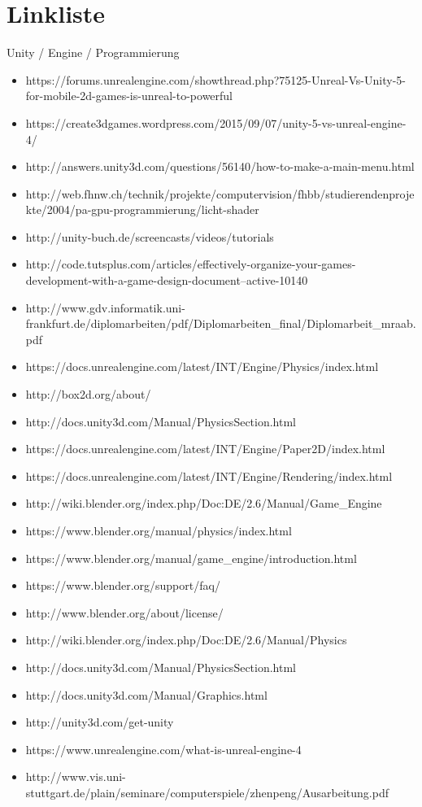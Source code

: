\section{Linkliste}

Unity / Engine / Programmierung
\begin{itemize}
\item https://forums.unrealengine.com/showthread.php?75125-Unreal-Vs-Unity-5-for-mobile-2d-games-is-unreal-to-powerful
\item https://create3dgames.wordpress.com/2015/09/07/unity-5-vs-unreal-engine-4/
\item http://answers.unity3d.com/questions/56140/how-to-make-a-main-menu.html
\item http://web.fhnw.ch/technik/projekte/computervision/fhbb/studierendenprojekte/2004/pa-gpu-programmierung/licht-shader
\item http://unity-buch.de/screencasts/videos/tutorials
\item http://code.tutsplus.com/articles/effectively-organize-your-games-development-with-a-game-design-document--active-10140
\item http://www.gdv.informatik.uni-frankfurt.de/diplomarbeiten/pdf/Diplomarbeiten\_final/Diplomarbeit\_mraab.pdf
\item https://docs.unrealengine.com/latest/INT/Engine/Physics/index.html
\item http://box2d.org/about/
\item http://docs.unity3d.com/Manual/PhysicsSection.html
\item https://docs.unrealengine.com/latest/INT/Engine/Paper2D/index.html
\item https://docs.unrealengine.com/latest/INT/Engine/Rendering/index.html
\item http://wiki.blender.org/index.php/Doc:DE/2.6/Manual/Game\_Engine
\item https://www.blender.org/manual/physics/index.html
\item https://www.blender.org/manual/game\_engine/introduction.html
\item https://www.blender.org/support/faq/
\item http://www.blender.org/about/license/
\item http://wiki.blender.org/index.php/Doc:DE/2.6/Manual/Physics
\item http://docs.unity3d.com/Manual/PhysicsSection.html
\item http://docs.unity3d.com/Manual/Graphics.html
\item http://unity3d.com/get-unity
\item https://www.unrealengine.com/what-is-unreal-engine-4
\item http://www.vis.uni-stuttgart.de/plain/seminare/computerspiele/zhenpeng/Ausarbeitung.pdf

\end{itemize}

